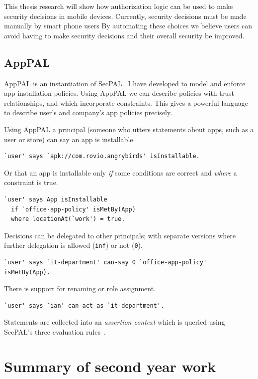 \documentclass[a4paper]{scrartcl}
\begin{document}
This thesis research will show how authorization logic can be used to make security decisions in mobile devices.
Currently, security decisions must be made manually by smart phone users
By automating these choices we believe users can avoid having to make security decisions and their overall security be improved.

\subsection{AppPAL}

AppPAL is an instantiation of SecPAL~\citep{Becker:2006vh} I have developed to model and enforce app installation policies.
Using AppPAL we can describe policies with trust relationships, and which incorporate constraints.
This gives a powerful language to describe user's and company's app policies precisely.

Using AppPAL a principal (someone who utters statements about apps, such as a user or store) can say an app is installable.
\begin{lstlisting}
`user' says `apk://com.rovio.angrybirds' isInstallable.
\end{lstlisting}
Or that an app is installable only \emph{if} some conditions are correct and \emph{where} a constraint is true.
\begin{lstlisting}
`user' says App isInstallable
  if `office-app-policy' isMetBy(App)
  where locationAt(`work') = true.
\end{lstlisting}
Decisions can be delegated to other principals; with separate versions where further delegation is allowed (\lstinline{inf}) or not (\lstinline{0}).
\begin{lstlisting}
`user' says `it-department' can-say 0 `office-app-policy' isMetBy(App).
\end{lstlisting}
There is support for renaming or role assignment.
\begin{lstlisting}
`user' says `ian' can-act-as `it-department'.
\end{lstlisting}
Statements are collected into an \emph{assertion context} which is queried using SecPAL's three evaluation rules~\citep{Becker:2006vh}.

\section{Summary of second year work}

\end{document}
